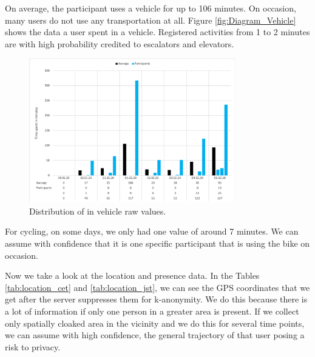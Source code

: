 On average, the participant uses a vehicle for up to 106 minutes. On occasion, many users do not use any transportation at all. Figure \ref{fig:Diagram_Vehicle} shows the data a user spent in a vehicle. Registered activities from 1 to 2 minutes are with high probability credited to escalators and elevators.  

\begin{figure}[htbp]
  \centering
  \includegraphics[width=0.8\textwidth]{figures/diagram_vehicle.png}
  \caption{Distribution of in vehicle raw values.} \label{fig:diagram_vehicle}
\end{figure}

For cycling, on some days, we only had one value of around 7 minutes. We can assume with confidence that it is one specific participant that is using the bike on occasion.

Now we take a look at the location and presence data. In the Tables \ref{tab:location_cet} and \ref{tab:location_jst}, we can see the GPS coordinates that we get after the server suppresses them for k-anonymity. We do this because there is a lot of information if only one person in a greater area is present. If we collect only spatially cloaked area in the vicinity and we do this for several time points, we can assume with high confidence, the general trajectory of that user posing a risk to privacy.

